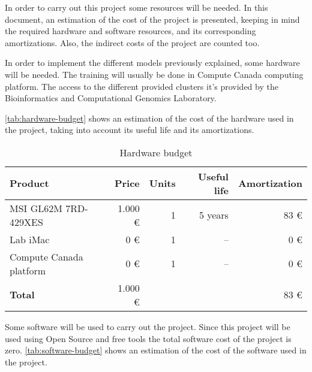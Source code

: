 
In order to carry out this project some resources will be needed. In this document, 
an estimation of the cost of the project is presented, keeping in mind the required
hardware and software resources, and its corresponding amortizations. Also, the
indirect costs of the project are counted too.


In order to implement the different models previously explained, some hardware will be
needed. The training will usually be done in Compute Canada computing platform. The
access to the different provided clusters it's provided by the Bioinformatics and 
Computational Genomics Laboratory.

\autoref{tab:hardware-budget} shows an estimation of the cost of the hardware used in the
project, taking into account its useful life and its amortizations.

\begin{table}[H]
  \centering
  \begin{tabular}{|l|r|r|r|r|}
    \hline
    \textbf{Product} & \textbf{Price} & \textbf{Units} & \textbf{Useful life} 
    & \textbf{Amortization} \\ \hline\hline

    MSI GL62M 7RD-429XES & 1.000 € & 1 & 5 years & 83 € \\ \hline
    Lab iMac & 0 € & 1 & -- & 0 € \\ \hline
    Compute Canada platform & 0 € & 1 & -- & 0 € \\ \hline

    \hline\hline
    \textbf{Total} & 1.000 € & \multicolumn{2}{|c|}{} & 83 € \\ \hline
  \end{tabular}
  \caption{Hardware budget \label{tab:hardware-budget}}
\end{table}


Some software will be used to carry out the project. Since this project will be used using
Open Source and free tools the total software cost of the project is zero. 
\autoref{tab:software-budget} shows an estimation of the cost of the software used in the 
project.

